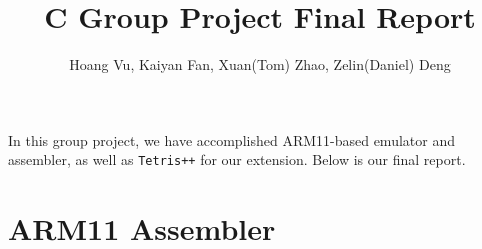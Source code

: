 \documentclass[11pt]{article}
\begin{document}
\title{C Group Project Final Report}
\author{Hoang Vu, Kaiyan Fan, Xuan(Tom) Zhao, Zelin(Daniel) Deng}

\maketitle

\noindent In this group project, we have accomplished ARM11-based emulator and assembler, as well as \texttt{Tetris++} for our extension. Below is our final report.


\section{ARM11 Assembler}

\end{document}
